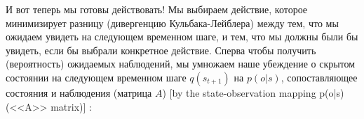 \documentclass[twoside,leqno, 11pt]{article}
\begin{document}
	\begin{figure}[h]
	\end{figure}
	
	
	И вот теперь мы готовы действовать! Мы выбираем действие, которое минимизирует разницу (дивергенцию Кульбака-Лейблера) между тем, что мы ожидаем увидеть на следующем временном шаге, и тем, что мы должны были бы увидеть, если бы выбрали конкретное действие. Сперва чтобы получить (вероятность) ожидаемых наблюдений, мы умножаем наше убеждение о скрытом состоянии на следующем временном шаге $q(s_{t+1})$ на $p(o|s)$, сопоставляющее состояния и наблюдения (матрица $A$) [by the state-observation mapping p(o|s) (<<A>> matrix)] :
	
	\begin{figure}[h]
	\end{figure}
	
\end{document}
